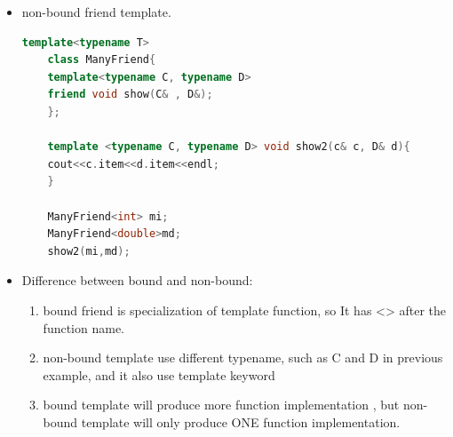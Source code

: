 \documentclass[a4paper,12pt,twoside]{book}
\begin{document}
\begin{itemize}
	\item non-bound friend template.
	\begin{lstlisting}[frame=single, language=c++]
	template<typename T>
	class ManyFriend{
	template<typename C, typename D>
	friend void show(C& , D&);
	};
	
	template <typename C, typename D> void show2(c& c, D& d){
	cout<<c.item<<d.item<<endl;
	}
	
	ManyFriend<int> mi;
	ManyFriend<double>md;
	show2(mi,md);
	\end{lstlisting}
	
	\item Difference between bound and non-bound:
	
	\begin{enumerate}
		\item bound friend is specialization of template function, so It has <> after the function name.
		
		\item non-bound template use different typename, such as C and D in previous example, and it also use template keyword
		
		\item bound template will produce more function implementation , but non-bound template will only produce ONE function implementation.
	\end{enumerate}

\end{itemize}
\end{document}

